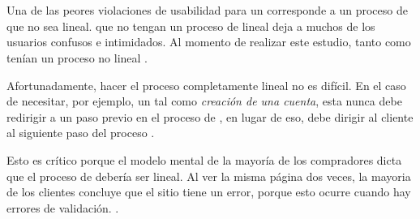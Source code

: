\section{\checkoutEF}\label{chapter:solucionimplementada:section:checkout}

	Una de las peores violaciones de usabilidad para un \websiteINT \ecommerceCOM corresponde a un proceso de \checkoutEF que no sea lineal. \websiteINT que no tengan un proceso de \checkoutEF lineal deja a muchos de los usuarios confusos e intimidados. Al momento de realizar este estudio, tanto \walmartNAME como \zapposNAME tenían un proceso \checkoutEF no lineal \cite{online_official_smashingmagazine_fundamental_guidelines_checkout_design}.


	Afortunadamente, hacer el proceso completamente lineal no es difícil. En el caso de necesitar, por ejemplo, un \subPasoCPT tal como \textit{creación de una cuenta}, esta nunca debe redirigir a un paso previo en el proceso de \checkoutEF, en lugar de eso, debe dirigir al cliente al siguiente paso del proceso \cite{online_official_smashingmagazine_fundamental_guidelines_checkout_design}. 

	Esto es crítico porque el modelo mental de la mayoría de los compradores dicta que el proceso de \checkoutEF debería ser lineal. Al ver la misma página dos veces, la mayoria de los clientes concluye que el sitio tiene un error, porque esto ocurre cuando hay errores de validación. \cite{online_official_smashingmagazine_fundamental_guidelines_checkout_design}. 

